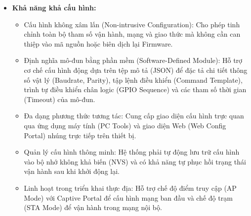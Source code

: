 \begin{itemize}
            \item \textbf{Khả năng khả cấu hình:}
            \begin{itemize}
                \item Cấu hình không xâm lấn (Non-intrusive Configuration): Cho phép tinh chỉnh toàn bộ tham số vận hành, mạng và giao thức mà không cần can thiệp vào mã nguồn hoặc biên dịch lại Firmware.
                \item Định nghĩa mô-đun bằng phần mềm (Software-Defined Module): Hỗ trợ cơ chế cấu hình động dựa trên tệp mô tả (JSON) để đặc tả chi tiết thông số vật lý (Baudrate, Parity), tập lệnh điều khiển (Command Template), trình tự điều khiển chân logic (GPIO Sequence) và các tham số thời gian (Timeout) của mô-đun.
                \item Đa dạng phương thức tương tác: Cung cấp giao diện cấu hình trực quan qua ứng dụng máy tính (PC Tools) và giao diện Web (Web Config Portal) nhúng trực tiếp trên thiết bị.
                \item Quản lý cấu hình thông minh: Hệ thống phải tự động lưu trữ cấu hình vào bộ nhớ không khả biến (NVS) và có khả năng tự phục hồi trạng thái vận hành sau khi khởi động lại.
                \item Linh hoạt trong triển khai thực địa: Hỗ trợ chế độ điểm truy cập (AP Mode) với Captive Portal để cấu hình mạng ban đầu và chế độ trạm (STA Mode) để vận hành trong mạng nội bộ.
            \end{itemize}
        \end{itemize}

